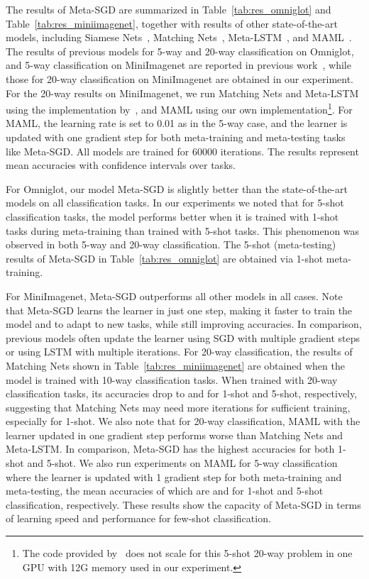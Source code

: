 \documentclass{article}
\begin{document}
The results of Meta-SGD are summarized in Table~\ref{tab:res_omniglot} and Table~\ref{tab:res_miniimagenet}, together with results of other state-of-the-art models, including Siamese Nets~\cite{koch2015siamese}, Matching Nets~\cite{vinyals2016matching}, Meta-LSTM~\cite{ravi2017optimization}, and MAML~\cite{finn2017model}. The results of previous models for 5-way and 20-way classification on Omniglot, and 5-way classification on MiniImagenet are reported in previous work~\cite{finn2017model}, while those for 20-way classification on MiniImagenet are obtained in our experiment. For the 20-way results on MiniImagenet, we run Matching Nets and Meta-LSTM using the implementation by~\cite{ravi2017optimization}, and MAML using our own implementation\footnote{The code provided by~\cite{finn2017model} does not scale for this 5-shot 20-way problem in one GPU with 12G memory used in our experiment.}.
For MAML, the learning rate  is set to 0.01 as in the 5-way case, and the learner is updated with one gradient step for both meta-training and meta-testing tasks like Meta-SGD. All models are trained for 60000 iterations.
The results represent mean accuracies with  confidence intervals over tasks.

For Omniglot, our model Meta-SGD is slightly better than the state-of-the-art models on all classification tasks.
In our experiments we noted that for 5-shot classification tasks, the model performs better when it is trained with 1-shot tasks during meta-training than trained with 5-shot tasks. This phenomenon was observed in both 5-way and 20-way classification. The 5-shot (meta-testing) results of Meta-SGD in Table~\ref{tab:res_omniglot} are obtained via 1-shot meta-training.



For MiniImagenet, Meta-SGD outperforms all other models in all cases. Note that Meta-SGD learns the learner in just one step, making it faster to train the model and to adapt to new tasks, while still improving accuracies. In comparison, previous models often update the learner using SGD with multiple gradient steps or using LSTM with multiple iterations.
For 20-way classification, the results of Matching Nets shown in Table~\ref{tab:res_miniimagenet} are obtained when the model is trained with 10-way classification tasks. When trained with 20-way classification tasks, its accuracies drop to  and  for 1-shot and 5-shot, respectively, suggesting that Matching Nets may need more iterations for sufficient training, especially for 1-shot.
We also note that for 20-way classification, MAML with the learner updated in one gradient step performs worse than Matching Nets and Meta-LSTM. In comparison, Meta-SGD has the highest accuracies for both 1-shot and 5-shot.
We also run experiments on MAML for 5-way classification where the learner is updated with 1 gradient step for both meta-training and meta-testing, the mean accuracies of which are  and  for 1-shot and 5-shot classification, respectively.
These results show the capacity of Meta-SGD in terms of learning speed and performance for few-shot classification.
\end{document}
